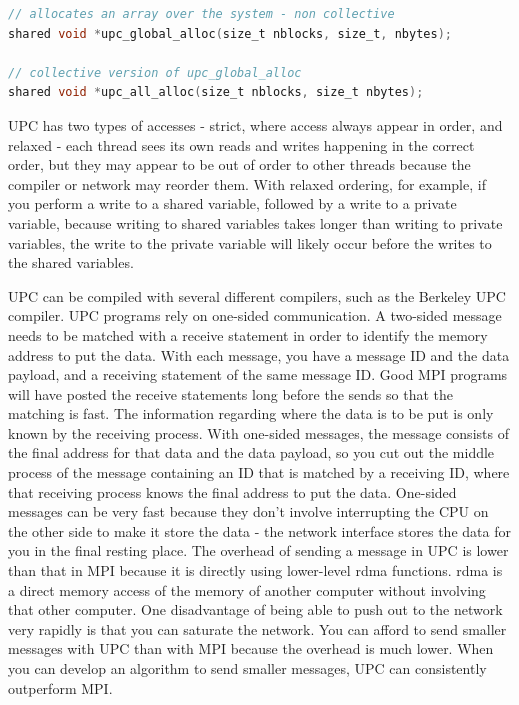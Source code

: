 \documentclass[10pt]{article}
\begin{document}
\begin{flushleft}
\begin{lstlisting}[language=C]
// allocates an array over the system - non collective
shared void *upc_global_alloc(size_t nblocks, size_t, nbytes);

// collective version of upc_global_alloc
shared void *upc_all_alloc(size_t nblocks, size_t nbytes);
\end{lstlisting}

UPC has two types of accesses - strict, where access always appear in order, and relaxed - each thread sees its own reads and writes happening in the correct order, but they may appear to be out of order to other threads because the compiler or network may reorder them. With relaxed ordering, for example, if you perform a write to a shared variable, followed by a write to a private variable, because writing to shared variables takes longer than writing to private variables, the write to the private variable will likely occur before the writes to the shared variables.

UPC can be compiled with several different compilers, such as the Berkeley UPC compiler. UPC programs rely on one-sided communication. A two-sided message needs to be matched with a receive statement in order to identify the memory address to put the data. With each message, you have a message ID and the data payload, and a receiving statement of the same message ID. Good MPI programs will have posted the receive statements long before the sends so that the matching is fast. The information regarding where the data is to be put is only known by the receiving process. With one-sided messages, the message consists of the final address for that data and the data payload, so you cut out the middle process of the message containing an ID that is matched by a receiving ID, where that receiving process knows the final address to put the data. One-sided messages can be very fast because they don't involve interrupting the CPU on the other side to make it store the data - the network interface stores the data for you in the final resting place. The overhead of sending a message in UPC is lower than that in MPI because it is directly using lower-level \gls{rdma} functions. \gls{rdma} is a direct memory access of the memory of another computer without involving that other computer. One disadvantage of being able to push out to the network very rapidly is that you can saturate the network. You can afford to send smaller messages with UPC than with MPI because the overhead is much lower. When you can develop an algorithm to send smaller messages, UPC can consistently outperform MPI. 



\end{flushleft}
\end{document}
